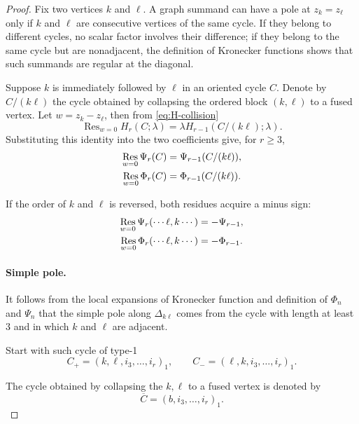 \documentclass[11pt,a4paper]{amsart}
\numberwithin{equation}{section}
\theoremstyle{definition}
\theoremstyle{remark}
\DeclareMathOperator*{\Res}{Res}
\begin{document}
\begin{proof}

Fix two vertices $k$ and $\ell$.  A graph summand can have a pole at $z_k=z_\ell$ only if $k$ and $\ell$ are consecutive vertices of the same cycle.  If they belong to different cycles, no scalar factor involves their difference; if they belong to the same cycle but are nonadjacent, the definition of Kronecker functions shows that such summands are regular at the diagonal.

Suppose $k$ is immediately followed by $\ell$ in an oriented cycle $C$.  Denote by $C/(k\ell)$ the cycle obtained by collapsing the ordered block $(k,\ell)$ to a fused vertex. Let $w=z_k-z_\ell$, then from  \eqref{eq:H-collision}
\begin{equation*}
 \Res_{w=0}H_r(C;\lambda)
 =\lambda H_{r-1}(C/(k\ell);\lambda).
\end{equation*}
Substituting this identity into the two coefficients give, for $r\geq3$,
\begin{align}
 \Res_{w=0}\Psi_r(C)
 &=\Psi_{r-1}(C/(k\ell)),
 \label{eq:Psi-cycle-residue}\\
 \Res_{w=0}\Phi_r(C)
 &=\Phi_{r-1}(C/(k\ell)).\notag
\end{align}

If the order of $k$ and $\ell$ is reversed, both residues acquire a minus sign:
\begin{align}
 \Res_{w=0}\Psi_r(\cdots \ell,k\cdots)
 &=-\Psi_{r-1},
 \label{eq:Psi-reverse-residue}\\
 \Res_{w=0}\Phi_r(\cdots \ell,k\cdots)
 &=-\Phi_{r-1}.\notag
\end{align}
\paragraph{Simple pole.}
It follows from the local expansions of Kronecker function and definition of $\Phi_n$ and $\Psi_n$ that the simple pole along $\Delta_{k\ell}$ comes from the cycle with length at least $3$ and in which $k$ and $\ell$ are adjacent.

Start with such cycle of type-1
\begin{equation*}
  C_+=(k,\ell,i_3,\ldots,i_r)_1,
  \qquad
  C_-=(\ell,k,i_3,\ldots,i_r)_1.
\end{equation*}

The cycle obtained by collapsing the $k,\ell$ to a fused vertex is denoted by
\begin{equation*}
  \overline C=(b,i_3,\ldots,i_r)_1.
\end{equation*}


\end{proof}
\end{document}
